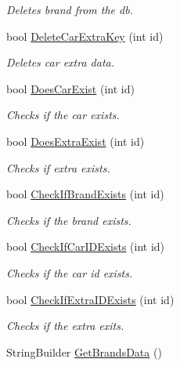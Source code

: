 \begin{DoxyCompactItemize}
\begin{DoxyCompactList}\small\item\em Deletes brand from the db. \end{DoxyCompactList}\item 
bool \mbox{\hyperlink{class_car_shop_1_1_logic_1_1_logic_a282e36a6aacd601780f92f47888dcdde}{Delete\+Car\+Extra\+Key}} (int id)
\begin{DoxyCompactList}\small\item\em Deletes car extra data. \end{DoxyCompactList}\item 
bool \mbox{\hyperlink{class_car_shop_1_1_logic_1_1_logic_a9e52939189a58e143da94181d3d23c9c}{Does\+Car\+Exist}} (int id)
\begin{DoxyCompactList}\small\item\em Checks if the car exists. \end{DoxyCompactList}\item 
bool \mbox{\hyperlink{class_car_shop_1_1_logic_1_1_logic_aef83ecf9811ba2af99936d03ab95ddb9}{Does\+Extra\+Exist}} (int id)
\begin{DoxyCompactList}\small\item\em Checks if extra exists. \end{DoxyCompactList}\item 
bool \mbox{\hyperlink{class_car_shop_1_1_logic_1_1_logic_a6f7a2a96646053b01067455ed0b8d0a5}{Check\+If\+Brand\+Exists}} (int id)
\begin{DoxyCompactList}\small\item\em Checks if the brand exists. \end{DoxyCompactList}\item 
bool \mbox{\hyperlink{class_car_shop_1_1_logic_1_1_logic_aa1e3ab411c53e0498145f1f77cb33766}{Check\+If\+Car\+I\+D\+Exists}} (int id)
\begin{DoxyCompactList}\small\item\em Checks if the car id exists. \end{DoxyCompactList}\item 
bool \mbox{\hyperlink{class_car_shop_1_1_logic_1_1_logic_a1c3a42d859ae472db17293626b87ff30}{Check\+If\+Extra\+I\+D\+Exists}} (int id)
\begin{DoxyCompactList}\small\item\em Checks if the extra exits. \end{DoxyCompactList}\item 
String\+Builder \mbox{\hyperlink{class_car_shop_1_1_logic_1_1_logic_ac41378bc905997f904da5353b20042a0}{Get\+Brands\+Data}} ()

\end{DoxyCompactItemize}
